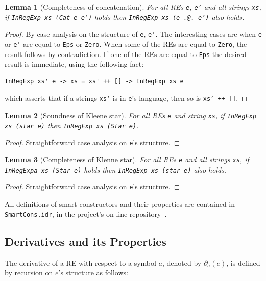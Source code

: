 \documentclass{llncs}
\newcommand{\idris}[1]{\texttt{#1}}%
\newtheorem{Lemma}{Lemma}
\begin{document}
\begin{Lemma}[Completeness of concatenation]
For all REs \idris{e}, \idris{e'} and all strings \idris{xs}, if
\idris{InRegExp xs (Cat e e')} holds then \idris{InRegExp xs (e
  .@. e')} also holds.
\end{Lemma}
\begin{proof}
  By case analysis on the structure of \idris{e}, \idris{e'}. The
  interesting cases are when \idris{e} or \idris{e'} are equal to
  \idris{Eps} or \idris{Zero}. When some of the REs are equal to
  \idris{Zero}, the result follows by contradiction. If one of the REs
  are equal to \idris{Eps} the desired result is immediate, using the
  following fact:
   \begin{verbatim}
InRegExp xs' e -> xs = xs' ++ [] -> InRegExp xs e
   \end{verbatim}
\vspace*{-\baselineskip}
which asserts that if a strings \idris{xs'} is in \idris{e}'s
language, then so is \idris{xs' ++ []}.
\end{proof}
\begin{Lemma}[Soundness of Kleene star]
For all REs \idris{e} and string \idris{xs}, if
\idris{InRegExp xs (star e)} then \idris{InRegExp xs (Star e)}.
\end{Lemma}
\begin{proof}
  Straightforward case analysis on \idris{e}'s structure.
\end{proof}
\begin{Lemma}[Completeness of Klenne star]
For all REs \idris{e} and all strings \idris{xs}, if \idris{InRegExpa
  xs (Star e)} holds then \idris{InRegExp xs (star e)} also holds.
\end{Lemma}
\begin{proof}
  Straightforward case analysis on \idris{e}'s structure.
\end{proof}

All definitions of smart constructors and their properties are
contained in \texttt{SmartCons.idr}, in the project's on-line
repository~\cite{regex-rep}.

\subsection{Derivatives and its Properties}

The derivative of a RE with respect to a symbol $a$, denoted by
$\partial_a(e)$, is defined by recursion on $e$'s structure as
follows:
\end{document}
